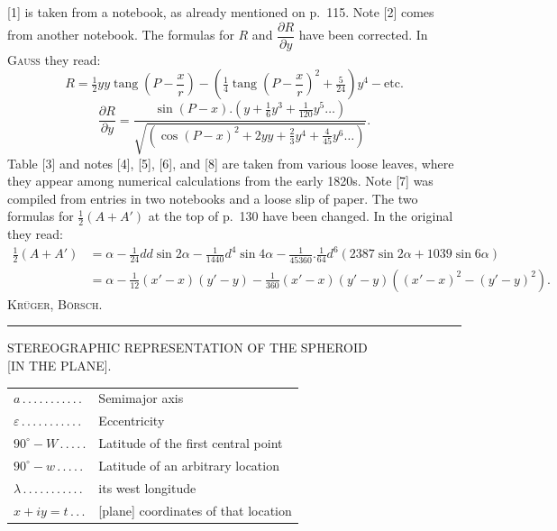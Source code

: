 \begingroup\footnotesize
[1] is taken from a notebook, as already mentioned on p.~115. Note [2] comes from another notebook. The formulas for $R$ and $\dfrac{\partial R}{\partial y}$ have been corrected. In \textsc{Gauss} they read:
\[
R=\tfrac12yy\operatorname{tang}\left(P-\frac xr\right)-\left(\tfrac14\operatorname{tang}\left(P-\frac xr\right)^2+\tfrac5{24}\right)y^4-\text{etc.}
\]
\[
\frac{\partial R}{\partial y}=\frac{\sin(P-x).(y+\tfrac16y^3+\tfrac1{120}y^5\ldots)}{\sqrt{(\cos(P-x)^2+2yy+\tfrac23y^4+\tfrac4{45}y^6\ldots)}}.
\]
Table [3] and notes [4], [5], [6], and [8] are taken from various loose leaves, where they appear among numerical calculations from the early 1820s. Note [7] was compiled from entries in two notebooks and a loose slip of paper. The two formulas for $\tfrac12(A+A')$ at the top of p.~130 have been changed. In the original they read:
\[
\begin{aligned}
\tfrac12(A+A')&=\alpha-\tfrac1{24}dd\sin2\alpha-\tfrac1{1440}d^4\sin4\alpha-\tfrac1{45360}.\tfrac1{64}d^6(2387\sin2\alpha+1039\sin6\alpha)\\
&=\alpha-\tfrac1{12}(x'-x)(y'-y)-\tfrac1{360}(x'-x)(y'-y)((x'-x)^2-(y'-y)^2).
\end{aligned}
\]
\hfill\textsc{Krüger, Börsch.}\par
\begin{center}\rule{.24\textwidth}{.4pt}\end{center}
\par\endgroup\par\endgroup
\clearpage
\begin{center}
{\large STEREOGRAPHIC REPRESENTATION OF THE SPHEROID\\{}[IN THE PLANE].}
\end{center}
\vspace{12mm}
\begin{center}
\begin{tabular}{@{}l@{ }l@{}}
$a\, .\, .\, .\, .\, .\, .\, .\, .\, .\, .\, .$&Semimajor axis\\[3pt]
$\varepsilon\, .\, .\, .\, .\, .\, .\, .\, .\, .\, .\, .$&Eccentricity\\[3pt]
$90^\circ-W\, .\, .\, .\, .\, .$&Latitude of the first central point\\[3pt]
$90^\circ-w\, .\, .\, .\, .\, .$&Latitude of an arbitrary location\\[3pt]
$\lambda\, .\, .\, .\, .\, .\, .\, .\, .\, .\, .\, .$&its west longitude\\[3pt]
$x+iy=t\, .\, .\, .$&[plane] coordinates of that location
\end{tabular}
\end{center}
